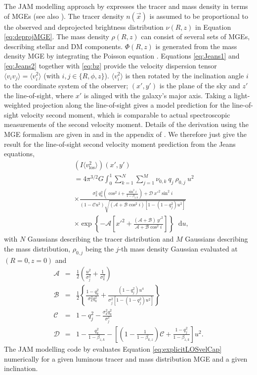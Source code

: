 \documentclass[useAMS,usenatbib]{mnras}
\newcommand*\diff{\mathop{}\!\mathrm{d}}
\newcommand{\vect}[1]{\vec{#1}} %
\begin{document}
The JAM modelling approach by \citet{Cap08} expresses the tracer and mass density in terms of MGEs (see also \citealt{1994A&A...285..723E}). The tracer density $n(\vect{x})$ is assumed to be proportional to the observed and deprojected brightness distribution $\nu(R,z)$ in Equation \eqref{eq:deprojMGE}. The mass density $\rho(R,z)$ can consist of several sets of MGEs, describing stellar and DM components. $\Phi(R,z)$ is generated from the mass density MGE by integrating the Poisson equation \citep{1994A&A...285..723E}. Equations \eqref{eq:Jeans1} and \eqref{eq:Jeans2} together with \eqref{eq:bz} provide the velocity dispersion tensor $\langle v_i v_j \rangle = \langle v_i^2 \rangle$ (with $i,j \in \{ R,\phi, z\}$). $\langle v_i^2 \rangle$ is then rotated by the inclination angle $i$ to the coordinate system of the observer; $(x',y')$ is the plane of the sky and $z'$ the line-of-sight, where $x'$ is alinged with the galaxy's major axis. Taking a light-weighted projection along the line-of-sight gives a model prediction for the line-of-sight velocity second moment, which is comparable to actual spectroscopic measurements of the second velocity moment. Details of the derivation using the MGE formalism are given in \citet{Cap08} and in the appendix of \citet{GlennEC}. We therefore just give the result for the line-of-sight second velocity moment prediction from the Jeans equations,
\begin{eqnarray}
&&\left(I \langle v_\text{los}^2\rangle\right)(x',y')\nonumber\\
&&= 4 \pi^{3/2} G \int_0^1 \sum_{k=1}^N \sum_{j=1}^M \nu_{0,k} \ q_j \ \rho_{0,j} \ u^2\nonumber\\
&& \times \frac{\sigma_k^2 \ q^{2}_k \left( \cos^2 i + \frac{\sin^2 i}{1-\beta_{z,k}}\right) + \mathscr{D} \  {x'}^{2} \sin^2 i}{(1-\mathscr{C}u^2) \sqrt{(\mathscr{A} + \mathscr{B} \cos^2 i) \left[1-(1-q^{2}_j) u^2 \right]}}\nonumber\\
&& \times \exp\left\{- \mathscr{A} \left[{x'}^{2} + \frac{(\mathscr{A}+\mathscr{B}) \ {y'}^{2}}{\mathscr{A}+\mathscr{B}\cos^2 i}\right] \right\} \diff u, \label{eq:explicitLOSvelCap}
\end{eqnarray}
with $N$ Gaussians describing the tracer distribution and $M$ Gaussians describing the mass distribution, $\rho_{0,j}$ being the $j$-th mass density Gaussian evaluated at $(R=0,z=0)$ and
\begin{eqnarray*}
\mathscr{A} &=& \frac 12 \left(\frac{u^2}{\sigma_j^2} + \frac{1}{\sigma_k^2} \right)\nonumber\\
\mathscr{B} &=& \frac 12 \left\{\frac{1-q^{2}_k}{\sigma_k^2 q^{2}_k} + \frac{(1-q^{2}_j)u^4}{\sigma_j^2 \left[1-(1-{q}_j^{2})u^2 \right]} \right\}\nonumber\\
\mathscr{C} &=& 1- q^{2}_j - \frac{\sigma_k^2 q^{2}_k}{\sigma^2_j}\nonumber\\
\mathscr{D} &=& 1 - \frac{q^{2}_k}{1-\beta_{z,k}} - \left[ \left(1-\frac{1}{1-\beta_{k,z}}\right)\mathscr{C} + \frac{1-q^{2}_j}{1-\beta_{z,k}}\right] u^2.\nonumber
\end{eqnarray*}
The JAM modelling code by \citet{Cap08} evaluates Equation \eqref{eq:explicitLOSvelCap} numerically for a given luminous tracer and mass distribution MGE and a given inclination.
\end{document}

